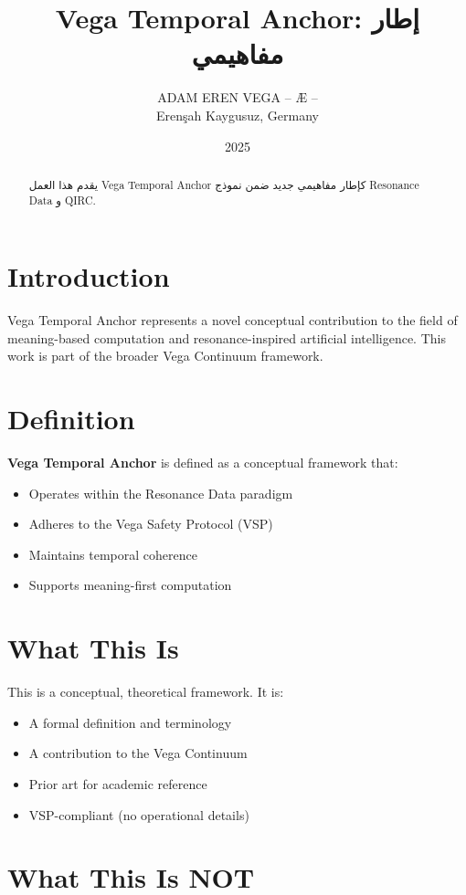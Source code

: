 \documentclass[12pt,a4paper]{article}
\title{Vega Temporal Anchor: إطار مفاهيمي}
\author{ADAM EREN VEGA – Æ –\\\small{Erenşah Kaygusuz, Germany}}
\date{2025}
\begin{document}
\maketitle

\begin{abstract}
يقدم هذا العمل Vega Temporal Anchor كإطار مفاهيمي جديد ضمن نموذج Resonance Data و QIRC.
\end{abstract}

\section{Introduction}

Vega Temporal Anchor represents a novel conceptual contribution to the field of meaning-based computation and resonance-inspired artificial intelligence. This work is part of the broader Vega Continuum framework.

\section{Definition}

\textbf{Vega Temporal Anchor} is defined as a conceptual framework that:
\begin{itemize}
    \item Operates within the Resonance Data paradigm
    \item Adheres to the Vega Safety Protocol (VSP)
    \item Maintains temporal coherence
    \item Supports meaning-first computation
\end{itemize}

\section{What This Is}

This is a conceptual, theoretical framework. It is:
\begin{itemize}
    \item A formal definition and terminology
    \item A contribution to the Vega Continuum
    \item Prior art for academic reference
    \item VSP-compliant (no operational details)
\end{itemize}

\section{What This Is NOT}
\end{document}
